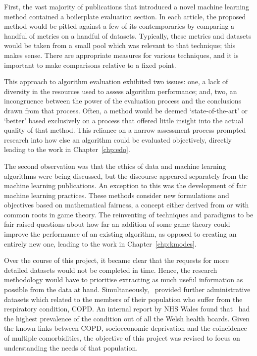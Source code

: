 First, the vast majority of publications that introduced a novel machine
learning method contained a boilerplate evaluation section. In each article, the
proposed method would be pitted against a few of its contemporaries by comparing
a handful of metrics on a handful of datasets. Typically, these metrics and
datasets would be taken from a small pool which was relevant to that technique;
this makes sense. There are appropriate measures for various techniques, and it
is important to make comparisons relative to a fixed point.

This approach to algorithm evaluation exhibited two issues: one, a lack
of diversity in the resources used to assess algorithm performance; and, two, an
incongruence between the power of the evaluation process and the conclusions
drawn from that process. Often, a method would be deemed `state-of-the-art' or
`better' based exclusively on a process that offered little insight into the
actual quality of that method. This reliance on a narrow assessment process
prompted research into how else an algorithm could be evaluated objectively,
directly leading to the work in Chapter~\ref{chp:edo}.

The second observation was that the ethics of data and machine learning
algorithms were being discussed, but the discourse appeared separately from the
machine learning publications. An exception to this was the development of fair
machine learning practices. These methods consider new formulations and
objectives based on mathematical fairness, a concept either derived from or with
common roots in game theory. The reinventing of techniques and paradigms to be
fair raised questions about how far an addition of some game theory could
improve the performance of an existing algorithm, as opposed to creating an
entirely new one, leading to the work in Chapter~\ref{chp:kmodes}.

Over the course of this project, it became clear that the requests for more
detailed datasets would not be completed in time. Hence, the research
methodology would have to prioritise extracting as much useful information as
possible from the data at hand. Simultaneously, \ctmuhb\ provided further
administrative datasets which related to the members of their population who
suffer from the respiratory condition, COPD. An internal report by NHS Wales
found that \ctmuhb\ had the highest prevalence of the condition out of all the
Welsh health boards. Given the known links between COPD, socioeconomic
deprivation and the coincidence of multiple comorbidities, the objective of this
project was revised to focus on understanding the needs of that population.


